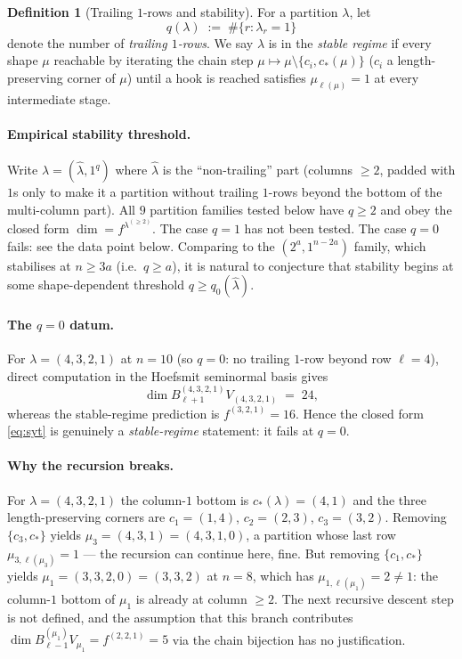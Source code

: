 \documentclass[11pt]{article}
\theoremstyle{definition}
\newtheorem{definition}[theorem]{Definition}
\begin{document}
\begin{definition}[Trailing $1$-rows and stability]\label{def:stable}
For a partition $\lambda$, let
\[
   q(\lambda) \;:=\; \#\{r : \lambda_r = 1\}
\]
denote the number of \emph{trailing $1$-rows}. We say $\lambda$ is in
the \emph{stable regime} if every shape $\mu$ reachable by iterating
the chain step
$\mu \mapsto \mu \setminus \{c_i, c_*(\mu)\}$ ($c_i$ a length-preserving
corner of $\mu$) until a hook is reached satisfies
$\mu_{\ell(\mu)} = 1$ at every intermediate stage.
\end{definition}

\paragraph{Empirical stability threshold.}
Write $\lambda = (\widehat\lambda, 1^q)$ where $\widehat\lambda$ is the
``non-trailing'' part (columns $\ge 2$, padded with $1$s only to make
it a partition without trailing $1$-rows beyond the bottom of the
multi-column part). All $9$ partition families tested below have
$q \ge 2$ and obey the closed form $\dim = f^{\lambda^{(\ge 2)}}$.
The case $q = 1$ has not been tested. The case $q = 0$ fails: see
the data point below. Comparing to the $(2^a, 1^{n-2a})$ family, which
stabilises at $n \ge 3a$ (i.e.\ $q \ge a$), it is natural to conjecture
that stability begins at some shape-dependent threshold $q \ge q_0(\widehat\lambda)$.

\paragraph{The $q = 0$ datum.}
For $\lambda = (4, 3, 2, 1)$ at $n = 10$ (so $q = 0$: no trailing
$1$-row beyond row $\ell = 4$), direct computation in the Hoefsmit
seminormal basis gives
\[
   \dim B_{\ell + 1}^{(4, 3, 2, 1)} V_{(4, 3, 2, 1)} \;=\; 24,
\]
whereas the stable-regime prediction is $f^{(3, 2, 1)} = 16$. Hence
the closed form \eqref{eq:syt} is genuinely a \emph{stable-regime}
statement: it fails at $q = 0$.

\paragraph{Why the recursion breaks.}
For $\lambda = (4, 3, 2, 1)$ the column-$1$ bottom is
$c_*(\lambda) = (4, 1)$ and the three length-preserving corners are
$c_1 = (1, 4)$, $c_2 = (2, 3)$, $c_3 = (3, 2)$. Removing
$\{c_3, c_*\}$ yields $\mu_3 = (4, 3, 1) = (4, 3, 1, 0)$, a partition
whose last row $\mu_{3,\ell(\mu_3)} = 1$ --- the recursion can continue
here, fine. But removing $\{c_1, c_*\}$ yields
$\mu_1 = (3, 3, 2, 0) = (3, 3, 2)$ at $n = 8$, which has
$\mu_{1, \ell(\mu_1)} = 2 \ne 1$: the column-$1$ bottom of $\mu_1$ is
already at column $\ge 2$. The next recursive descent step is not
defined, and the assumption that this branch contributes
$\dim B_{\ell - 1}^{(\mu_1)} V_{\mu_1} = f^{(2, 2, 1)} = 5$ via the
chain bijection has no justification.
\end{document}
